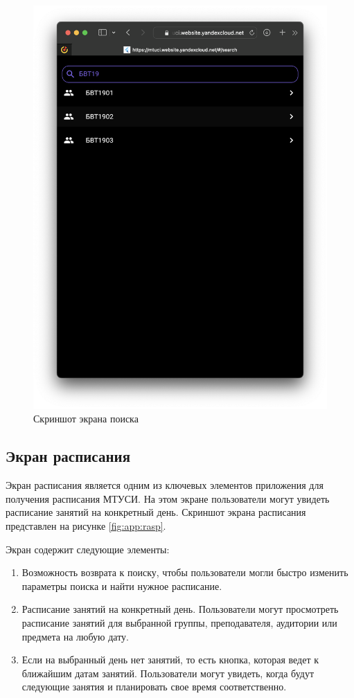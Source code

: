 \begin{figure}
\centering
\includegraphics[width=0.5\linewidth]{images/app/search.png}
\caption{Скриншот экрана поиска}
\label{fig:app:search}
\end{figure}

\break
\subsection{Экран расписания}
Экран расписания является одним из ключевых элементов приложения для получения расписания МТУСИ.
На этом экране пользователи могут увидеть расписание занятий на конкретный день. 
Скриншот экрана расписания представлен на рисунке \ref{fig:app:rasp}.

Экран содержит следующие элементы:
\begin{enumerate}
    \item Возможность возврата к поиску, 
    чтобы пользователи могли быстро изменить параметры поиска и найти нужное расписание.
    \item Расписание занятий на конкретный день.
    Пользователи могут просмотреть расписание занятий для выбранной группы,
    преподавателя, аудитории или предмета на любую дату.
    \item Если на выбранный день нет занятий,
    то есть кнопка, которая ведет к ближайшим датам занятий.
    Пользователи могут увидеть, когда будут следующие занятия и планировать свое время соответственно.
\end{enumerate}


